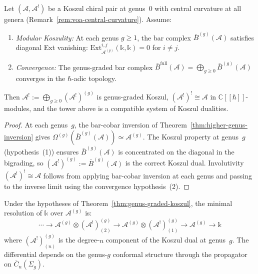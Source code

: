 \begin{theorem}
\label{thm:genus-graded-koszul}\label{thm:genus-graded-koszul-duality}\label{thm:extended-koszul}
Let $(\mathcal{A}, \mathcal{A}^!)$ be a Koszul chiral pair at genus~0
with central curvature at all genera (Remark~\ref{rem:voa-central-curvature}).
Assume:
\begin{enumerate}
\item \emph{Modular Koszulity:} At each genus $g \geq 1$, the bar complex
$\bar{B}^{(g)}(\mathcal{A})$ satisfies diagonal Ext vanishing:
$\mathrm{Ext}^{i,j}_{\mathcal{A}^{(g)}}(\mathbb{k}, \mathbb{k}) = 0$ for $i \neq j$.
\item \emph{Convergence:} The genus-graded bar complex
$\bar{B}^{\mathrm{full}}(\mathcal{A}) = \bigoplus_{g \geq 0} \bar{B}^{(g)}(\mathcal{A})$
converges in the $\hbar$-adic topology.
\end{enumerate}
Then $\mathcal{A}^! := \bigoplus_{g \geq 0} (\mathcal{A}^!)^{(g)}$
is genus-graded Koszul, $(\mathcal{A}^!)^! \cong \mathcal{A}$ in
$\mathbb{C}[\![\hbar]\!]$-modules, and the tower above is a compatible
system of Koszul dualities.
\end{theorem}

\begin{proof}
At each genus~$g$, the bar-cobar inversion of Theorem~\ref{thm:higher-genus-inversion}
gives $\Omega^{(g)}(\bar{B}^{(g)}(\mathcal{A})) \simeq \mathcal{A}^{(g)}$.
The Koszul property at genus~$g$ (hypothesis~(1)) ensures
$\bar{B}^{(g)}(\mathcal{A})$ is concentrated on the diagonal in the bigrading,
so $(\mathcal{A}^!)^{(g)} := \bar{B}^{(g)}(\mathcal{A})$ is the correct Koszul dual.
Involutivity $(\mathcal{A}^!)^! \cong \mathcal{A}$ follows from applying
bar-cobar inversion at each genus and passing to the inverse limit using the
convergence hypothesis~(2).
\end{proof}

\begin{lemma}
\label{lem:genus-graded-koszul-resolution}
Under the hypotheses of Theorem~\ref{thm:genus-graded-koszul}, the minimal
resolution of $\mathbb{k}$ over $\mathcal{A}^{(g)}$ is:
\[\cdots \to \mathcal{A}^{(g)} \otimes (\mathcal{A}^!)^{(g)}_{(2)}
\to \mathcal{A}^{(g)} \otimes (\mathcal{A}^!)^{(g)}_{(1)}
\to \mathcal{A}^{(g)} \to \mathbb{k}\]
where $(\mathcal{A}^!)^{(g)}_{(n)}$ is the degree-$n$ component of the
Koszul dual at genus~$g$.  The differential depends on the genus-$g$
conformal structure through the propagator on $\overline{C}_n(\Sigma_g)$.
\end{lemma}

